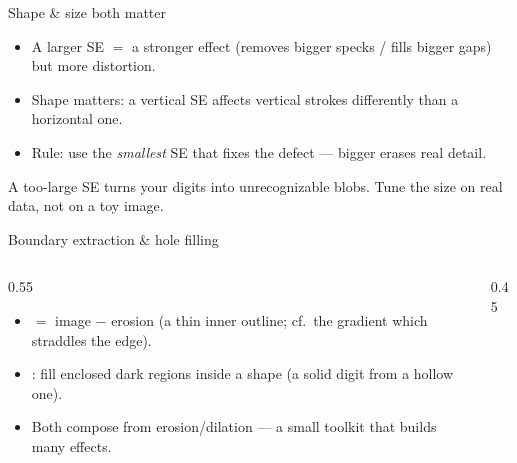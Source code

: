 \documentclass[10pt,aspectratio=169]{beamer}
\begin{document}
\begin{frame}{Shape \& size both matter}
  \begin{itemize}
    \item A larger SE $=$ a stronger effect (removes bigger specks / fills bigger gaps) but more distortion.
    \item Shape matters: a vertical SE affects vertical strokes differently than a horizontal one.
    \item Rule: use the \emph{smallest} SE that fixes the defect — bigger erases real detail.
  \end{itemize}
  \begin{badbox}
    A too-large SE turns your digits into unrecognizable blobs. Tune the size on real data, not on a toy image.
  \end{badbox}
\end{frame}

\begin{frame}{Boundary extraction \& hole filling}
  \begin{columns}[T]
    \begin{column}{0.55\textwidth}
      \begin{itemize}
        \item {} $=$ image $-$ erosion (a thin inner outline; cf.\ the gradient which straddles the edge).
        \item {}: fill enclosed dark regions inside a shape (a solid digit from a hollow one).
        \item Both compose from erosion/dilation — a small toolkit that builds many effects.
      \end{itemize}
    \end{column}
    \begin{column}{0.45\textwidth}
      \begin{center}
      \end{center}
    \end{column}
  \end{columns}
\end{frame}
\end{document}
